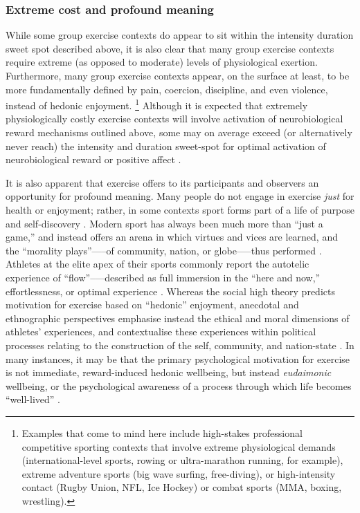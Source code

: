 \begin{CJK}{UTF8}{gbsn}
\subsubsection{Extreme cost and profound meaning}
While some group exercise contexts do appear to sit within the intensity duration sweet spot described above, it is also clear that many group exercise contexts require extreme (as opposed to moderate) levels of physiological exertion.  Furthermore, many group exercise contexts appear, on the surface at least, to be more fundamentally defined by pain, coercion, discipline, and even violence, instead of hedonic enjoyment.
      \footnote{Examples that come to mind here include high-stakes professional competitive sporting contexts that involve extreme physiological demands (international-level sports, rowing or ultra-marathon running, for example), extreme adventure sports (big wave surfing, free-diving), or high-intensity contact (Rugby Union, NFL, Ice Hockey) or combat  sports (MMA, boxing, wrestling).}
Although it is expected that extremely physiologically costly exercise contexts will involve activation of neurobiological reward mechanisms outlined above, some may on average exceed (or alternatively never reach) the intensity and duration sweet-spot for optimal activation of neurobiological reward \citep{Raichlen2013} or positive affect \citep{Ekkekakis2011,Reed2006}.

It is also apparent that exercise offers to its participants and observers an opportunity for profound meaning.  Many people do not engage in exercise \textit{just} for health or enjoyment; rather, in some contexts sport forms part of a life of purpose and self-discovery \citep[see, for example][]{Jackson1995,Jones2004,White2011}.  Modern sport has always been much more than ``just a game,'' and instead offers an arena in which virtues and vices are learned, and the ``morality plays''—--of community, nation, or globe—--thus performed \citep{Elias1986,McNamee2008}.  Athletes at the elite apex of their sports commonly report the autotelic experience of ``flow''--—described as full immersion in the ``here and now,'' effortlessness, or optimal experience \citep{Csikszentmihalyi1992,Dietrich2004}.  Whereas the social high theory predicts motivation for exercise based on ``hedonic'' enjoyment, anecdotal and ethnographic perspectives emphasise instead the ethical and moral dimensions of athletes’ experiences, and contextualise these experiences within political processes relating to the construction of the self, community, and nation-state \citep{Alter1993,Brownell1995,Downey2005b,Wacquant2004}.
In many instances, it may be that the primary psychological motivation for exercise is not immediate, reward-induced hedonic wellbeing, but instead \textit{eudaimonic} wellbeing, or the psychological awareness of a process through which life becomes ``well-lived'' \citep{Fave2009,Huta2013}.


\end{CJK}

